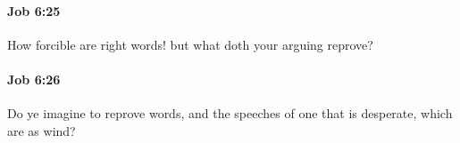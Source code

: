 		\paragraph{Job 6:25} %
			\label{JOB-6-25}

			How forcible are right words! but what doth your arguing reprove?


		\paragraph{Job 6:26} %
			\label{JOB-6-26}

			Do ye imagine to reprove words, and the speeches of one that is desperate, which are as wind?


